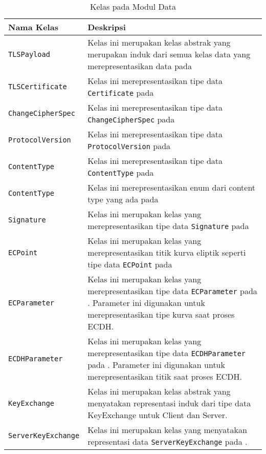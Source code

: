 \begin{longtable}{|p{3.5cm}|p{9cm}|}
  \caption{Kelas pada Modul Data} \label{tab:impl.data} \\

  \hline
    Nama Kelas & Deskripsi \\ \hline
    \endhead

    \texttt{TLSPayload} & Kelas ini merupakan kelas abstrak yang merupakan induk dari semua kelas data yang merepresentasikan data pada \textcite{rfc5246}\\ \hline
    \texttt{TLSCertificate} & Kelas ini merepresentasikan tipe data \texttt{Certificate} pada \textcite{rfc5246} \\ \hline
    \texttt{ChangeCipherSpec} & Kelas ini merepresentasikan tipe data \texttt{ChangeCipherSpec} pada \textcite{rfc5246} \\ \hline
    \texttt{ProtocolVersion} & Kelas ini merepresentasikan tipe data \texttt{ProtocolVersion} pada \textcite{rfc5246} \\ \hline
    \texttt{ContentType} & Kelas ini merepresentasikan tipe data \texttt{ContentType} pada \textcite{rfc5246} \\ \hline
    \texttt{ContentType} & Kelas ini merepresentasikan enum dari content type yang ada pada \textcite{rfc5246} \\ \hline
    \texttt{Signature} & Kelas ini merupakan kelas yang merepresentasikan tipe data \texttt{Signature} pada \textcite{rfc5246}\\ \hline
    \texttt{ECPoint} & Kelas ini merupakan kelas yang merepresentasikan titik kurva eliptik seperti tipe data \texttt{ECPoint} pada \textcite{rfc4492}\\ \hline
    \texttt{ECParameter} & Kelas ini merupakan kelas yang merepresentasikan tipe data \texttt{ECParameter} pada \textcite{rfc4492}. Parameter ini digunakan untuk merepresentasikan tipe kurva saat proses ECDH.\\ \hline
    \texttt{ECDHParameter} & Kelas ini merupakan kelas yang merepresentasikan tipe data \texttt{ECDHParameter} pada \textcite{rfc4492}. Parameter ini digunakan untuk merepresentasikan titik saat proses ECDH.\\ \hline
    \texttt{KeyExchange} & Kelas ini merupakan kelas abstrak yang menyatakan representasi induk dari tipe data KeyExchange untuk Client dan Server.\\ \hline
    \texttt{ServerKeyExchange} & Kelas ini merupakan kelas yang menyatakan representasi data \texttt{ServerKeyExchange} pada \textcite{rfc5246}.\\ \hline

\end{longtable}
